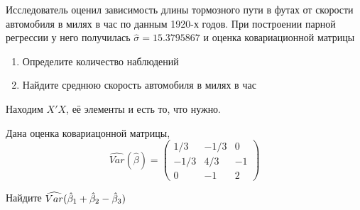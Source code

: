\begin{problem}
\begin{knitrout}
\color{fgcolor}\begin{kframe}
\begin{alltt}
 \hlkwb{<-} \hlopt{~}
 \hlkwb{<-} 
 \hlkwb{<-} \hlopt{$}
\end{alltt}
\end{kframe}
\end{knitrout}

Исследователь оценил зависимость длины тормозного пути в футах от скорости автомобиля в милях в час по данным 1920-х годов.
При построении парной регрессии у него получилась $\hat{\sigma}=15.3795867$ и оценка ковариационной матрицы 


\begin{kframe}
\begin{alltt}
\hlstd{(}
\end{alltt}


{\ttfamily\noindent\bfseries{}}\end{kframe}


\begin{enumerate}
\item Определите количество наблюдений
\item Найдите среднюю скорость автомобиля в милях в час
\end{enumerate}
\end{problem}

\begin{solution}
Находим $X'X$, её элементы и есть то, что нужно.
\end{solution}



\begin{problem}
Дана оценка ковариацонной матрицы, 
\[
\widehat{Var}(\hat{\beta})=\begin{pmatrix}
1/3 & -1/3 & 0 \\
-1/3 & 4/3 & -1 \\
0 & -1 & 2
\end{pmatrix}
\]

Найдите $\widehat{Var}(\hat{\beta}_1+\hat{\beta}_2-\hat{\beta}_3)$
\end{problem}

